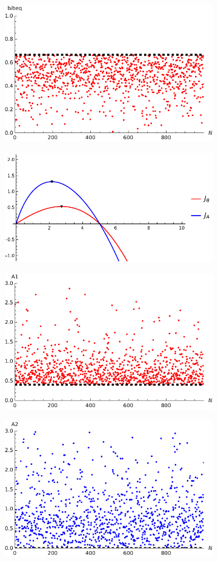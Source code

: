 \documentclass{article}
\begin{document}
	\begin{figure}[h!]
		
		\begin{subfigure}{\textwidth}
			\includegraphics[width=0.45\linewidth]{plot.pdf}
		\end{subfigure}
		\begin{subfigure}{\textwidth}
			\includegraphics[width=0.45\linewidth]{plotJ.pdf}
		\end{subfigure}
	\end{figure}
	\hfill
	\begin{figure}[h!]
		\begin{subfigure}{ \textwidth}
			\includegraphics[width=0.45\linewidth]{plotA1.pdf}
		\end{subfigure}
		\begin{subfigure}{ \textwidth}
			\includegraphics[width=0.45\linewidth]{plotA2.pdf}
		\end{subfigure}
	\end{figure}
\end{document}
